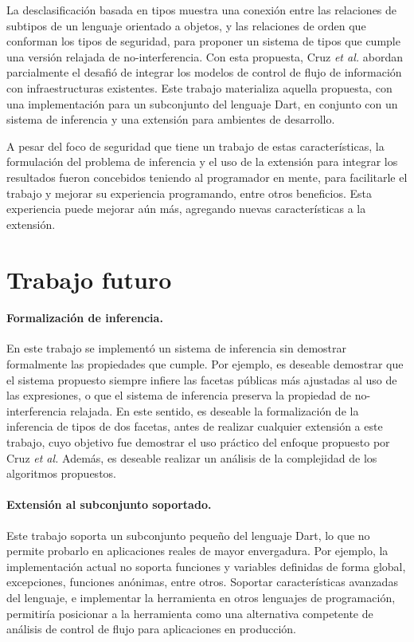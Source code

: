 \begin{conclusion}

	La desclasificación basada en tipos muestra una conexión entre las relaciones de subtipos de un lenguaje orientado a objetos, y las relaciones de orden que conforman los tipos de seguridad, para proponer un sistema de tipos que cumple una versión relajada de no-interferencia. Con esta propuesta, Cruz \textit{et al.} abordan parcialmente el desafió de integrar los modelos de control de flujo de información con infraestructuras existentes. Este trabajo materializa aquella propuesta, con una implementación para un subconjunto del lenguaje Dart, en conjunto con un sistema de inferencia y una extensión para ambientes de desarrollo.

	A pesar del foco de seguridad que tiene un trabajo de estas características, la formulación del problema de inferencia y el uso de la extensión para integrar los resultados fueron concebidos teniendo al programador en mente, para facilitarle el trabajo y mejorar su experiencia programando, entre otros beneficios. Esta experiencia puede mejorar aún más, agregando nuevas características a la extensión.

	\section*{Trabajo futuro}

	\paragraph{Formalización de inferencia.}En este trabajo se implementó un sistema de inferencia sin demostrar formalmente las propiedades que cumple. Por ejemplo, es deseable demostrar que el sistema propuesto siempre infiere las facetas públicas más ajustadas al uso de las expresiones, o que el sistema de inferencia preserva la propiedad de no-interferencia relajada. En este sentido, es deseable la formalización de la inferencia de tipos de dos facetas, antes de realizar cualquier extensión a este trabajo, cuyo objetivo fue demostrar el uso práctico del enfoque propuesto por Cruz \textit{et al.} Además, es deseable realizar un análisis de la complejidad de los algoritmos propuestos.

	\paragraph{Extensión al subconjunto soportado.}Este trabajo soporta un subconjunto pequeño del lenguaje Dart, lo que no permite probarlo en aplicaciones reales de mayor envergadura. Por ejemplo, la implementación actual no soporta funciones y variables definidas de forma global, excepciones, funciones anónimas, entre otros. Soportar características avanzadas del lenguaje, e implementar la herramienta en otros lenguajes de programación, permitiría posicionar a la herramienta como una alternativa competente de análisis de control de flujo para aplicaciones en producción.


\end{conclusion}
